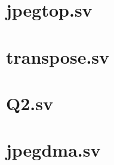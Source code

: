 \documentclass[a4paper]{article}
\begin{document}
\newpage
\begin{appendices}
\begin{changemargin}{-3cm}{-3cm}
\section{jpegtop.sv}


\section{transpose.sv}


\section{Q2.sv}


\section{jpegdma.sv}

\end{changemargin}
\end{appendices}
\end{document}

